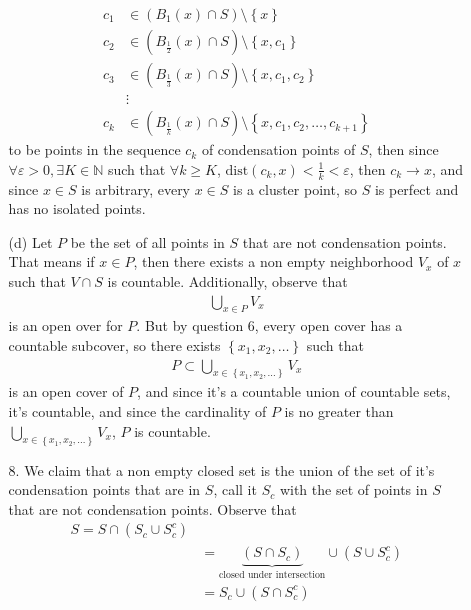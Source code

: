 \documentclass[12pt]{article}
\newcommand{\NN}{\mathbb{N}}
\newcommand\set[1]{\left\lbrace #1 \right\rbrace}
\newcommand\dist[1]{\text{dist}(#1 )}
\begin{document}
\begin{itemize}
\begin{itemize}
        	\begin{align*}
        	 c_1 &\in (B_1(x)\cap S) \setminus \set{x} \\
        	 c_2 &\in (B_\frac{1}{2}(x) \cap S) \setminus \set{x,c_1} \\
        	 c_3 &\in (B_\frac{1}{3}(x) \cap S) \setminus \set{x,c_1,c_2} \\
        	 &\vdots\\
        	 c_k &\in (B_\frac{1}{k} (x) \cap S) \setminus \set{x,c_1,c_2,\ldots,c_{k+1}}
        	\end{align*}
        	to be points in the sequence $c_k$ of condensation points of $S$, then since $\forall \varepsilon > 0, \exists K \in \NN$ such that $\forall k \geq K$, $\dist{c_k,x} < \frac{1}{k} < \varepsilon$, then $c_k \to x$, and since $x \in S$ is arbitrary, every $x \in S$ is a cluster point, so $S$ is perfect and has no isolated points. 
        	\item[(d)]
        	Let $P$ be the set of all points in $S$ that are not condensation points. That means if $x \in P$, then there exists a non empty neighborhood $V_x$ of $x$ such that $V \cap S$ is countable. Additionally, observe that 
        	\begin{align*}
        	 \bigcup_{x \in P} V_x
        	\end{align*}
        	is an open over for $P$. But by question 6, every open cover has a countable subcover, so there exists $\set{x_1,x_2,\ldots}$ such that 
        	\begin{align*}
        	P \subset \bigcup_{x \in \set{x_1,x_2,\ldots}} V_x
        	\end{align*}
        	is an open cover of $P$, and since it's a countable union of countable sets, it's countable, and since the cardinality of $P$ is no greater than $\displaystyle \bigcup_{x \in \set{x_1,x_2,\ldots}} V_x$, $P$ is countable.
        	\item[8.]
        	We claim that a non empty closed set is the union of the set of it's condensation points that are in $S$, call it $S_c$ with the set of points in $S$ that are not condensation points. Observe that 
         \begin{align*}
             S = S \cap (S_c \cup S_c^c)  \\
             &= \underbrace{(S \cap S_c)}_{\text{closed under intersection}} \cup (S \cup S_c^c) \\
             &= S_c \cup (S \cap S_c^c)
         \end{align*}

\end{itemize}
\end{itemize}
\end{document}
